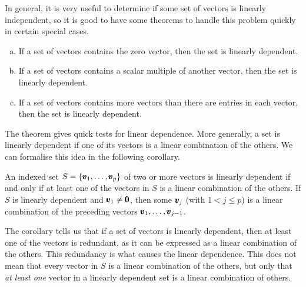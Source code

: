 In general, it is very useful to determine if some set of vectors is linearly independent, so it is good to have
some theorems to handle this problem quickly in certain special cases.

\begin{theorem}
    \begin{enumerate}[(a)]
        \item If a set of vectors contains the zero vector, then the set is linearly dependent.
        \item If a set of vectors contains a scalar multiple of another vector, then the set is linearly dependent.
        \item If a set of vectors contains more vectors than there are entries in each vector, then the set is linearly dependent.
    \end{enumerate}
\end{theorem}

The theorem gives quick tests for linear dependence. More generally, a set is linearly dependent if one of its vectors is a linear combination of the others. We can formalise this idea in the following corollary.

\begin{corollary}
    An indexed set $S = \left\{\pmb{v}_1, \ldots, \pmb{v}_p\right\}$ of two or more vectors is linearly dependent if and only if at least one of the vectors in $S$ is a linear combination of the others. If $S$ is linearly dependent and $\pmb{v}_1 \neq \pmb{0}$, then some $\pmb{v}_j$ (with $1 < j \leq p$) is a linear combination of the preceding vectors $\pmb{v}_1, \ldots, \pmb{v}_{j-1}$.
\end{corollary}

\begin{remark}
    The corollary tells us that if a set of vectors is linearly dependent, then at least one of the vectors is redundant, as it can be expressed as a linear combination of the others. This redundancy is what causes the linear dependence. This does not mean that every vector in $S$ is a linear combination of the others, but only that \textit{at least one} vector in a linearly dependent set is a linear combination of others.
\end{remark}


